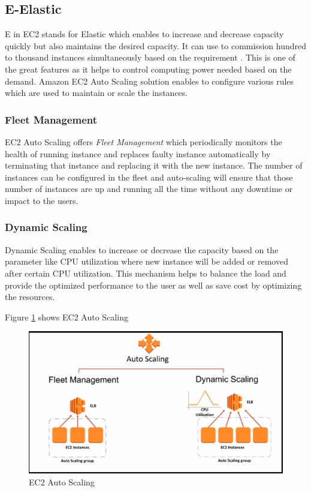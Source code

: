 \subsection{E-Elastic}
E in EC2 stands for Elastic which enables to increase and decrease capacity quickly but also maintains the desired capacity. It can use to commission hundred to thousand instances simultaneously based on the requirement \cite{www-aws-ec2}. This is one of the great features as it helps to control computing power needed based on the demand. 
Amazon EC2 Auto Scaling \cite{www-aws-ec2autoscaling} solution enables to configure various rules which are used to maintain or scale the instances. 
\subsubsection{Fleet Management}
EC2 Auto Scaling offers \emph{Fleet Management} which periodically monitors the health of running instance and replaces faulty instance automatically by terminating that instance and replacing it with the new instance. The number of instances can be configured in the fleet and auto-scaling will ensure that those number of instances are up and running all the time without any downtime or impact to the users.
\subsubsection{Dynamic Scaling}
Dynamic Scaling enables to increase or decrease the capacity based on the parameter like CPU utilization where new instance will be added or removed after certain CPU utilization. This mechanism helps to balance the load and provide the optimized performance to the user as well as save cost by optimizing the resources.

Figure \ref{f:ec2-auto-scaling} shows EC2 Auto Scaling
\begin{figure}[!ht]
  \centering\includegraphics[width=\columnwidth]{images/ec2AutoScaling.PNG}
  \caption{EC2 Auto Scaling \cite{www-aws-ec2autoscaling}}\label{f:ec2-auto-scaling}
\end{figure}

